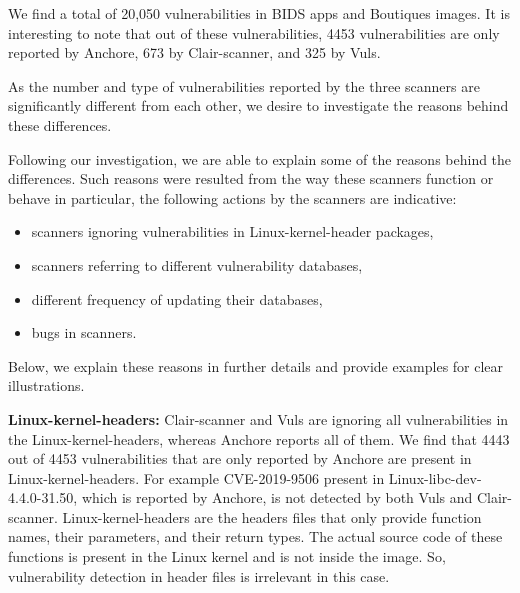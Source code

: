 \documentclass[a4paper,num-refs]{oup-contemporary}
\begin{document}
We find a total of 20,050 vulnerabilities in BIDS apps and Boutiques images.
It is interesting to note that out of these vulnerabilities, 4453 vulnerabilities are only
reported by Anchore, 673 by Clair-scanner, and 325 by Vuls.

As the number and type of vulnerabilities reported by the three scanners are significantly different from each other,
we desire to investigate the reasons behind these differences.

Following our investigation, we are able to explain some of the reasons behind
the differences. 
Such reasons were resulted from the way these scanners function or behave 
in particular, the following actions by the scanners are indicative:
\begin{itemize}
   \item scanners ignoring vulnerabilities in Linux-kernel-header packages,
   \item scanners referring to different vulnerability databases,
   \item different frequency of updating their databases,
   \item bugs in scanners. 
\end{itemize}

Below, we explain these reasons in further details and provide examples
for clear illustrations.
%

\textbf{Linux-kernel-headers:} Clair-scanner and Vuls are ignoring all vulnerabilities in the Linux-kernel-headers,
whereas Anchore reports all of them.
We find that 4443 out of 4453 vulnerabilities that are only reported by Anchore are present in Linux-kernel-headers.
For example CVE-2019-9506 present in Linux-libc-dev-4.4.0-31.50, which is reported by Anchore, is not
detected by both Vuls and Clair-scanner.
Linux-kernel-headers are the headers files that only provide function names, their parameters, and their
return types.
The actual source code of these functions is present in the Linux kernel and is not inside the image.
So, vulnerability detection in header files
is irrelevant in this case.
\end{document}
